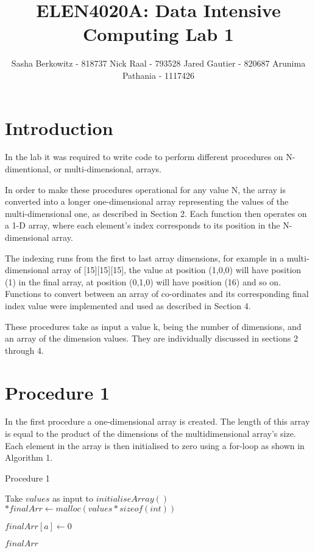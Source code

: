 \documentclass[twocolumn]{IEEEtran}
\title{ELEN4020A: Data Intensive Computing Lab 1}
\author{Sasha Berkowitz - 818737 Nick Raal - 793528 Jared Gautier - 820687 Arunima Pathania - 1117426}
\begin{document}
\maketitle
\section{Introduction}

In the lab it was required to write code to perform different procedures on N-dimentional, or multi-dimensional, arrays.

In order to make these procedures operational for any value N, the array is converted into a longer one-dimensional array representing the values of the multi-dimensional one, as described in Section 2. Each function then operates on a 1-D array, where each element’s index corresponds to its position in the N-dimensional array.

The indexing runs from the first to last array dimensions, for example in a multi-dimensional array of [15][15][15], the value at position (1,0,0) will have position (1) in the final array, at position (0,1,0) will have position (16) and so on. Functions to convert between an array of co-ordinates and its corresponding final index value were implemented and used as described in Section 4.

These procedures take as input a value k, being the number of dimensions, and an array of the dimension values. They are individually discussed in sections 2 through 4.

\section{Procedure 1}
In the first procedure a one-dimensional array is created. The length of this array is equal to the product of the dimensions of the multidimensional array’s size. Each element in the array is then initialised to zero using a for-loop as shown in Algorithm 1.


\begin{algorithm}
	\caption{Procedure 1}
	\begin{algorithmic} 
		\STATE
		\STATE Take $values$ as input to $initialiseArray()$
		\STATE
		\STATE $*finalArr \leftarrow malloc(values*sizeof(int))$
	
		
		\STATE $finalArr[a] \leftarrow 0$
		\ENDFOR
			
	
		\RETURN $finalArr$
	\end{algorithmic}
\end{algorithm}
\end{document}
